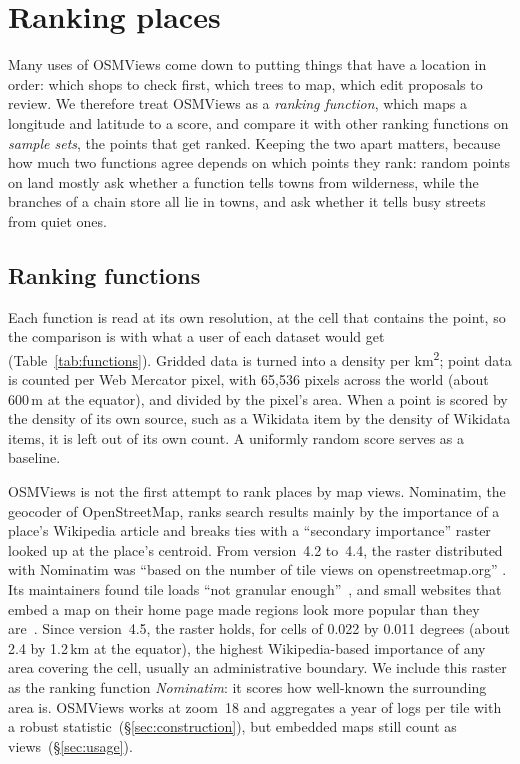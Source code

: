 \documentclass[10pt,twocolumn]{article}
\begin{document}
\section{Ranking places}\label{sec:ranking}
Many uses of OSMViews come down to putting things that have a location in
order: which shops to check first, which trees to map, which edit proposals
to review. We therefore treat OSMViews as a \emph{ranking function}, which
maps a longitude and latitude to a score, and compare it with other ranking
functions on \emph{sample sets}, the points that get ranked. Keeping the two
apart matters, because how much two functions agree depends on which points
they rank: random points on land mostly ask whether a function tells towns
from wilderness, while the branches of a chain store all lie in towns, and
ask whether it tells busy streets from quiet ones.

\subsection{Ranking functions}
Each function is read at its own resolution, at the cell that contains the
point, so the comparison is with what a user of each dataset would get
(Table~\ref{tab:functions}). Gridded data is turned into a density per
km\textsuperscript{2}; point data is counted per Web Mercator pixel, with
65{,}536 pixels across the world (about 600\,m at the equator), and
divided by the pixel's area. When a point is scored by the density of its
own source, such as a Wikidata item by the density of Wikidata items, it is
left out of its own count. A uniformly random score serves as a baseline.

OSMViews is not the first attempt to rank places by map views.
Nominatim, the geocoder of OpenStreetMap, ranks search results mainly by
the importance of a place's Wikipedia article and breaks ties with a
\enquote{secondary importance} raster looked up at the place's centroid.
From version~4.2 to~4.4, the raster distributed with Nominatim was
\enquote{based on the number of tile views on openstreetmap.org}
\cite{nominatim}. Its maintainers found tile loads \enquote{not granular
enough}~\cite{nominatimblog}, and small websites that embed a map on their
home page made regions look more popular than they
are~\cite{secondaryimportance}. Since version~4.5, the raster holds, for
cells of 0.022 by 0.011 degrees (about 2.4 by 1.2\,km at the equator), the
highest Wikipedia-based importance of any area covering the cell, usually
an administrative boundary. We include this raster as the ranking
function \emph{Nominatim}: it scores how well-known the surrounding area
is. OSMViews works at zoom~18 and aggregates a year of logs per tile with
a robust statistic~(\S\ref{sec:construction}), but embedded maps still
count as views~(\S\ref{sec:usage}).
\end{document}
